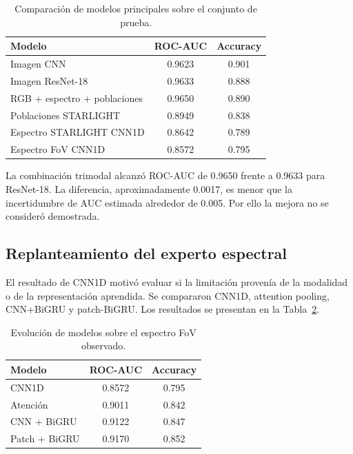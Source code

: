 \documentclass[letterpaper,11pt]{article}
\begin{document}
\begin{table}[H] 
  \centering 
  \caption{Comparación de modelos principales sobre el conjunto de prueba.} 
  \label{tab:ablacion}

  \begin{tabular}{lcc} 
    \toprule Modelo & ROC-AUC & Accuracy\\ 
    \midrule Imagen CNN & 0.9623 & 0.901\\ 
    Imagen ResNet-18 & 0.9633 & 0.888\\ 
    RGB + espectro + poblaciones & 0.9650 & 0.890\\ 
    Poblaciones STARLIGHT & 0.8949 & 0.838\\ 
    Espectro STARLIGHT CNN1D & 0.8642 & 0.789\\ 
    Espectro FoV CNN1D & 0.8572 & 0.795\\ 
    \bottomrule 
  \end{tabular}

\end{table}

La combinación trimodal alcanzó ROC-AUC de 0.9650 frente a 0.9633 para ResNet-18. La diferencia, aproximadamente 0.0017, es menor que la incertidumbre de AUC estimada alrededor de 0.005. Por ello la mejora no se consideró demostrada. 

\subsection{Replanteamiento del experto espectral}

El resultado de CNN1D motivó evaluar si la limitación provenía de la modalidad o de la representación aprendida. Se compararon CNN1D, attention pooling, CNN+BiGRU y patch-BiGRU. Los resultados se presentan en la Tabla~\ref{tab:espectro}.

\begin{table}[H] 
  \centering 
  \caption{Evolución de modelos sobre el espectro FoV observado.} 
  \label{tab:espectro}

  \begin{tabular}{lcc} 
    \toprule Modelo & ROC-AUC & Accuracy\\ 
    \midrule CNN1D & 0.8572 & 0.795\\ 
    Atención & 0.9011 & 0.842\\ 
    CNN + BiGRU & 0.9122 & 0.847\\ 
    Patch + BiGRU & 0.9170 & 0.852\\ 
    \bottomrule 
  \end{tabular}

\end{table} 
\end{document}
